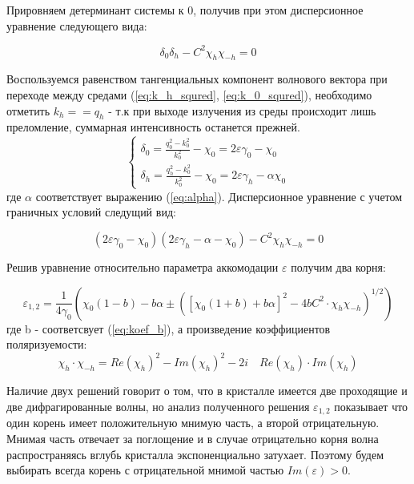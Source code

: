 Прировняем детерминант системы к 0, получив при этом дисперсионное уравнение следующего вида:

\begin{equation}
   \delta_0 \delta_h -C^2 \chi_h \chi_{-h} = 0
\end{equation}

Воспользуемся равенством тангенциальных компонент волнового вектора при переходе между средами (\ref{eq:k_h_squred}, \ref{eq:k_0_squred}),
необходимо отметить $k_h == q_h$ - т.к при выходе излучения из среды происходит лишь преломление, суммарная интенсивность останется прежней.
\begin{equation}
 \begin{cases}
   \delta_0 = \frac{q_0^2 - k_0^2}{k_0^2} - \chi_0 = 2\varepsilon\gamma_0 - \chi_0
   \\
   \delta_h = \frac{q_h^2 - k_0^2}{k_0^2} - \chi_0 = 2\varepsilon\gamma_h - \alpha \chi_0
 \end{cases}
\end{equation}
\noindent
где $\alpha$ соответствует выражению (\ref{eq:alpha}). Дисперсионное уравнение с учетом граничных условий
следущий вид:

\begin{equation}
   (2\varepsilon \gamma_0 - \chi_0)(2\varepsilon \gamma_h - \alpha - \chi_0) - C^2 \chi_h\chi_{-h} = 0
\end{equation}

Решив уравнение относительно параметра аккомодации $\varepsilon$ получим два корня:

\begin{equation}
   \varepsilon_{1,2} = \frac{1}{4\gamma_0} \left( \chi_0 (1-b) - b\alpha \pm \left( [\chi_0(1+b)+b\alpha]^2 - 4bC^2 \cdot \chi_{h}\chi_{-h} \right)^{1/2} \right)
\end{equation}
\noindent
где b - соответсвует (\ref{eq:koef_b}),  а произведение коэффициентов поляризуемости:
 $$\chi_{h} \cdot \chi_{-h} = Re(\chi_{h})^2-Im(\chi_{h})^2 - 2i \quad Re(\chi_{h}) \cdot Im(\chi_{h})$$

Наличие двух решений говорит о том, что в кристалле имеется две проходящие и две дифрагированные волны, но
анализ полученного решения $ \varepsilon_{1,2}$ показывает что один корень имеет положительную мнимую часть, а второй
отрицательную. Мнимая часть отвечает за поглощение и в случае отрицательно корня волна распространяясь
вглубь кристалла экспоненциально затухает. Поэтому будем выбирать всегда корень с отрицательной мнимой частью
$Im(\varepsilon)>0$.

